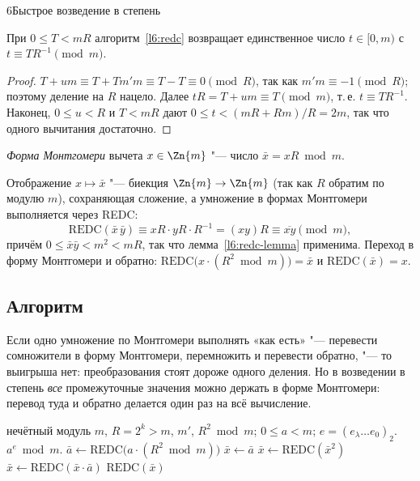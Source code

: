 \begin{lecture}{6}{Быстрое возведение в степень}
\begin{lemma}\label{l6:redc-lemma}
При $0 \le T < mR$ алгоритм~\ref{l6:redc} возвращает единственное число $t \in [0, m)$ с
$t \equiv T R^{-1} \pmod m$.
\end{lemma}

\begin{proof}
$T + um \equiv T + T m' m \equiv T - T \equiv 0 \pmod R$, так как $m' m \equiv -1 \pmod R$;
поэтому деление на $R$ нацело. Далее $tR = T + um \equiv T \pmod m$, т.\,е. $t \equiv TR^{-1}$.
Наконец, $0 \le u < R$ и $T < mR$ дают $0 \le t < (mR + Rm)/R = 2m$, так что одного вычитания
достаточно.
\end{proof}

\begin{definition}
\emph{Форма Монтгомери} вычета $x \in \Zn{m}$ "--- число $\bar x = xR \bmod m$.
\end{definition}

Отображение $x \mapsto \bar x$ "--- биекция $\Zn{m} \to \Zn{m}$ (так как $R$ обратим по модулю
$m$), сохраняющая сложение, а умножение в формах Монтгомери выполняется через REDC:
\begin{equation}\label{l6:montmul}
  \mathrm{REDC}(\bar x\,\bar y) \equiv xR \cdot yR \cdot R^{-1} = (xy) R \equiv \overline{xy} \pmod m,
\end{equation}
причём $0 \le \bar x\bar y < m^2 < mR$, так что лемма~\ref{l6:redc-lemma} применима.
Переход в форму Монтгомери и обратно:
$\mathrm{REDC}\bigl(x \cdot (R^2 \bmod m)\bigr) = \bar x$ и $\mathrm{REDC}(\bar x) = x$.

\subsection{Алгоритм}

Если одно умножение по Монтгомери выполнять «как есть» "--- перевести сомножители в форму
Монтгомери, перемножить и перевести обратно, "--- то выигрыша нет: преобразования стоят
дороже одного деления. Но в возведении в степень \emph{все} промежуточные значения можно держать
в форме Монтгомери: перевод туда и обратно делается один раз на всё вычисление.

\begin{algorithm}\label{l6:montexp}
\begin{algorithmic}[1]
\Require нечётный модуль $m$, $R = 2^k > m$, $m'$, $R^2 \bmod m$; $0 \le a < m$;
  $e = (e_\lambda \dots e_0)_2$.
\Ensure $a^e \bmod m$.
\State $\bar a \gets \mathrm{REDC}\bigl(a \cdot (R^2 \bmod m)\bigr)$ 
\State $\bar x \gets \bar a$
  \State $\bar x \gets \mathrm{REDC}(\bar x^2)$
   $\bar x \gets \mathrm{REDC}(\bar x \cdot \bar a)$ \EndIf
\EndFor
\State \Return $\mathrm{REDC}(\bar x)$ 
\end{algorithmic}
\end{algorithm}


\end{lecture}
